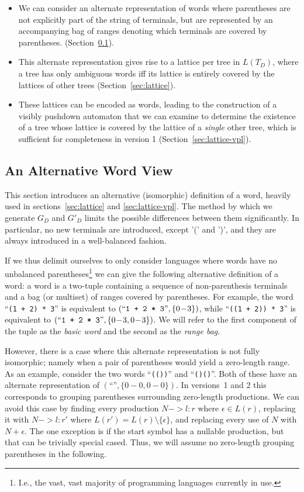 \documentclass[acmsmall,review,anonymous]{acmart}\settopmatter{printfolios=true,printccs=false,printacmref=false}
\newcommand{\range}[2]{#1\!-\!#2}
\begin{document}
\begin{itemize}
\item We can consider an alternate representation of words where parentheses are not explicitly part of the string of terminals, but are represented by an accompanying bag of ranges denoting which terminals are covered by parentheses. (Section~\ref{sec:word-view}).
\item This alternate representation gives rise to a lattice per tree in $L(T_D)$, where a tree has only ambiguous words iff its lattice is entirely covered by the lattices of other trees (Section~\ref{sec:lattice}).
\item These lattices can be encoded as words, leading to the construction of a visibly pushdown automaton that we can examine to determine the existence of a tree whose lattice is covered by the lattice of a \emph{single} other tree, which is sufficient for completeness in version 1 (Section~\ref{sec:lattice-vpl}).
\end{itemize}

\subsection{An Alternative Word View} \label{sec:word-view}

This section introduces an alternative (isomorphic) definition of a word, heavily used in sections~\ref{sec:lattice} and \ref{sec:lattice-vpl}. The method by which we generate $G_D$ and $G'_D$ limits the possible differences between them significantly. In particular, no new terminals are introduced, except '(' and ')', and they are always introduced in a well-balanced fashion.

If we thus delimit ourselves to only consider languages where words have no unbalanced parentheses\footnote{I.e., the vast, vast majority of programming languages currently in use.} we can give the following alternative definition of a word: a word is a two-tuple containing a sequence of non-parenthesis terminals and a bag (or multiset) of ranges covered by parentheses. For example, the word ``\verb|(1 + 2) * 3|'' is equivalent to $(\text{``}\verb|1 + 2 * 3|\text{''}, \{\range{0}{3}\})$, while ``\verb|((1 + 2)) * 3|'' is equivalent to $(\text{``}\verb|1 + 2 * 3|\text{''}, \{\range{0}{3}, \range{0}{3}\})$. We will refer to the first component of the tuple as the \emph{basic word} and the second as the \emph{range bag}.

However, there is a case where this alternate representation is not fully isomorphic; namely when a pair of parentheses would yield a zero-length range. As an example, consider the two words ``\verb|(())|'' and ``\verb|()()|''. Both of these have an alternate representation of $(\text{``}\text{''}, \{\range{0}{0}, \range{0}{0}\})$. In versions~1 and 2 this corresponds to grouping parentheses surrounding zero-length productions. We can avoid this case by finding every production $N -> l : r$ where $\epsilon \in L(r)$, replacing it with $N -> l : r'$ where $L(r') = L(r) \setminus \{\epsilon\}$, and replacing every use of $N$ with $N + \epsilon$. The one exception is if the start symbol has a nullable production, but that can be trivially special cased. Thus, we will assume no zero-length grouping parentheses in the following.
\end{document}
